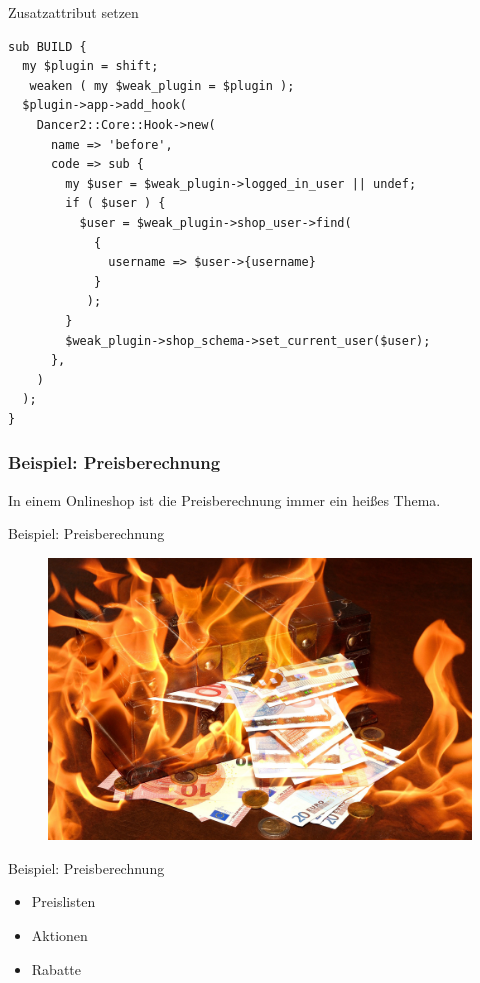 \begin{frame}[fragile]{Zusatzattribut setzen}
\begin{lstlisting}
sub BUILD {
  my $plugin = shift;
   weaken ( my $weak_plugin = $plugin );
  $plugin->app->add_hook(
    Dancer2::Core::Hook->new(
      name => 'before',
      code => sub {
        my $user = $weak_plugin->logged_in_user || undef;
        if ( $user ) {
          $user = $weak_plugin->shop_user->find(
            {
              username => $user->{username}
            }
           );
        }
        $weak_plugin->shop_schema->set_current_user($user);
      },
    )
  );
}
\end{lstlisting}
\end{frame}


\subsubsection{Beispiel: Preisberechnung}

In einem Onlineshop ist die Preisberechnung immer ein heißes Thema.

\begin{frame}{Beispiel: Preisberechnung}
\begin{figure}[!ht]
\centering
\includegraphics[width=1\linewidth]{img/treasure-chest-fire.jpg}
\end{figure}
\end{frame}

\begin{frame}{Beispiel: Preisberechnung}
  \begin{itemize}
  \item Preislisten
  \item Aktionen
  \item Rabatte
  \end{itemize}
\end{frame}

